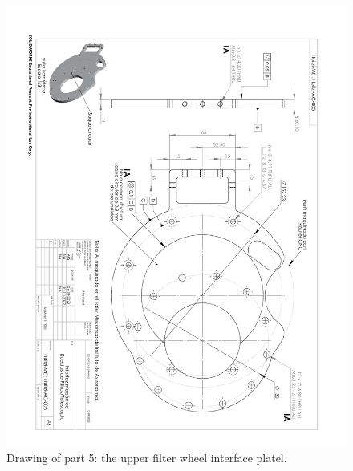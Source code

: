 \begin{figure}
\begin{center}
\includegraphics[angle=180,width=0.9\linewidth]{figures/huitzi-f20-part-5.pdf}
\end{center}
\caption{Drawing of part 5: the upper filter wheel interface platel.}
\label{figure:huitzi-f20-part-5}
\end{figure}

